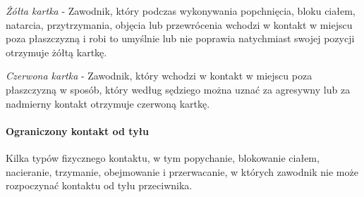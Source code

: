 \documentclass[12pt]{article}
\begin{document}
\emph{Żółta kartka} - Zawodnik, który podczas wykonywania popchnięcia,
bloku ciałem, natarcia, przytrzymania, objęcia lub przewrócenia wchodzi
w kontakt w miejscu poza płaszczyzną i robi to umyślnie lub nie poprawia
natychmiast swojej pozycji otrzymuje żółtą kartkę.

\emph{Czerwona kartka} - Zawodnik, który wchodzi w kontakt w miejscu
poza płaszczyzną w sposób, który według sędziego można uznać za
agresywny lub za nadmierny kontakt otrzymuje czerwoną kartkę.

\paragraph{Ograniczony kontakt od tyłu}

Kilka typów fizycznego kontaktu, w tym popychanie, blokowanie ciałem,
nacieranie, trzymanie, obejmowanie i przerwacanie, w których zawodnik
nie może rozpoczynać kontaktu od tyłu przeciwnika.
\end{document}

